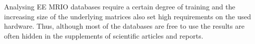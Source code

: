 Analysing EE MRIO databases require a certain degree of training and the
increasing size of the underlying matrices also set high requirements on the
used hardware. Thus, although most of the databases are free to use the results
are often hidden in the supplements of scientific articles and reports.